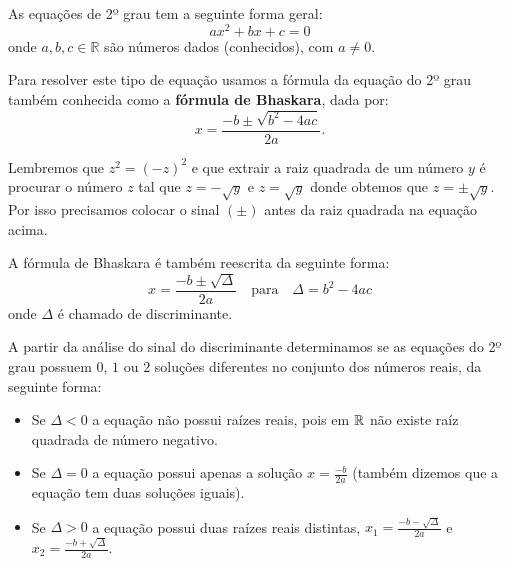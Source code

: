 \begin{obs}
   As equações de 2º grau tem a seguinte forma geral:
\begin{equation*}
ax^2 + bx + c = 0
\end{equation*}
  onde $a, b, c \in \mathbb{R}$ são números dados (conhecidos), com $a \neq 0 $.
\end{obs}


Para resolver este tipo de equação usamos a fórmula da equação do 2º grau também conhecida como a \textbf{fórmula de Bhaskara}, dada por:
\begin{equation*}
  x= \frac{-b \pm \sqrt{b^2 - 4ac}}{2a}.
\end{equation*}

Lembremos que $z^2= (-z)^2$ e que extrair a raiz quadrada de um número $y$ é procurar o número $z$ tal que $z= -\sqrt{y}$ e $z= \sqrt{y}$ donde obtemos que $z= \pm \sqrt{y}$. Por isso precisamos colocar o sinal $(\pm)$ antes da raiz quadrada na equação acima.

A fórmula de Bhaskara é também reescrita da seguinte forma:
\begin{equation*}
x= \frac{-b \pm \sqrt{\Delta}}{2a} \ \ \ \text{ para } \ \ \ \Delta= b^2 - 4ac
\end{equation*}
onde $\Delta$ é chamado de discriminante.

A partir da análise do sinal do discriminante determinamos se as equações do 2º grau possuem $0$, $1$ ou $2$ soluções diferentes no conjunto dos números reais, da seguinte forma:
\begin{itemize}
\item Se $\Delta < 0$ a equação não possui raízes reais, pois em $\mathbb{R}$ não existe raíz quadrada de número negativo.
\item Se $\Delta = 0$ a equação possui apenas a solução $x= \frac{-b}{2a}$ (também dizemos que a equação tem duas soluções iguais).
\item Se $\Delta > 0$ a equação possui duas raízes reais distintas, $x_1= \frac{-b - \sqrt{\Delta}}{2a}$ e $x_2= \frac{-b + \sqrt{\Delta}}{2a}$.
\end{itemize}




